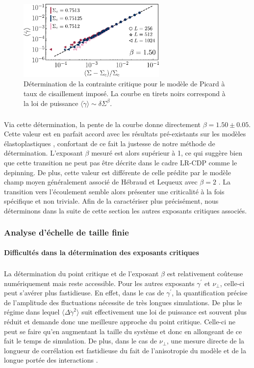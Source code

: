 \begin{figure}[h]
	\centering
	\includegraphics[width=0.65\textwidth]{Chapitre4/Figures/CasPhysique/CP_Classic.pdf}
	\caption{Détermination de la contrainte critique pour le modèle de Picard à taux de cisaillement imposé. La courbe en tirets noirs correspond à la loi de puissance $\langle\dot{\gamma}\rangle \sim \delta\Sigma^\beta$.}
	\label{fig:CP_Classic}
\end{figure}

\subparagraph{}Via cette détermination, la pente de la courbe donne directement $\beta=1.50 \pm 0.05$. Cette valeur est en parfait accord avec les résultats pré-existants sur les modèles élastoplastiques \cite{ferrero_criticality_2019, lin_scaling_2014}, confortant de ce fait la justesse de notre méthode de détermination. L'exposant $\beta$ mesuré est alors supérieur à 1, ce qui suggère bien que cette transition ne peut pas être décrite dans le cadre LR-CDP comme le depinning. De plus, cette valeur est différente de celle prédite par le modèle champ moyen généralement associé de Hébraud et Lequeux avec $\beta=2$ \cite{hebraud_mode-coupling_1998}. La transition vers l'écoulement semble alors présenter une criticalité à la fois spécifique et non triviale. Afin de la caractériser plus précisément, nous déterminons dans la suite de cette section les autres exposants critiques associés.

\subsubsection{Analyse d'échelle de taille finie}

\paragraph{Difficultés dans la détermination des exposants critiques}

\subparagraph{}La détermination du point critique et de l'exposant $\beta$ est relativement coûteuse numériquement mais reste accessible. Pour les autres exposants $\gamma^\prime$ et $\nu_\perp$, celle-ci peut s'avérer plus fastidieuse. En effet, dans le cas de $\gamma^\prime$, la quantification précise de l'amplitude des fluctuations nécessite de très longues simulations. De plus le régime dans lequel $\langle\Delta\dot{\gamma}^2\rangle$ suit effectivement une loi de puissance est souvent plus réduit et demande donc une meilleure approche du point critique. Celle-ci ne peut se faire qu'en augmentant la taille du système et donc en allongeant de ce fait le temps de simulation. De plus, dans le cas de $\nu_\perp$, une mesure directe de la longueur de corrélation est fastidieuse du fait de l'anisotropie du modèle et de la longue portée des interactions \cite{liu_critical_2016}.

